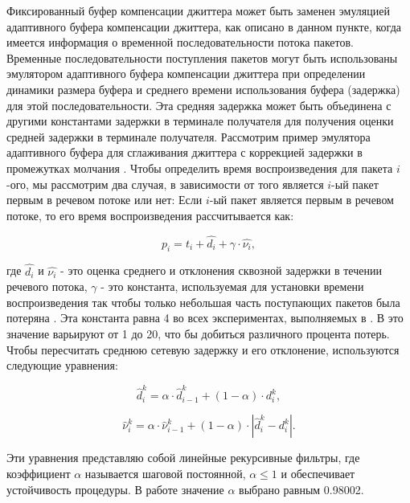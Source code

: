 Фиксированный буфер компенсации джиттера может быть заменен эмуляцией адаптивного буфера компенсации джиттера, как описано в данном пункте, когда имеется информация о временной последовательности потока пакетов. 
Временные последовательности поступления пакетов могут быть использованы эмулятором адаптивного буфера компенсации джиттера при определении динамики размера буфера и среднего времени использования буфера (задержка) для этой последовательности. Эта средняя задержка может быть объединена с другими константами задержки в терминале получателя для получения оценки средней задержки в терминале получателя. 
Рассмотрим пример эмулятора адаптивного буфера для сглаживания джиттера с коррекцией задержки в промежутках молчания \cite{Ramjee}. Чтобы определить время воспроизведения для пакета $i$-ого, мы рассмотрим два случая, в зависимости от того является $i$-ый пакет первым в речевом потоке или нет:
Если $i$-ый пакет является первым в речевом потоке, то его время воспроизведения рассчитывается как:

\begin{equation}\label{eq3:playout}
p_i=t_i+\hat{d_i}+\gamma\cdot\hat{\nu_i},
\end{equation}

\noindent где $\hat{d_i}$ и $\hat{\nu_i}$ - это оценка среднего и отклонения сквозной задержки в течении речевого потока, $\gamma$ - это константа, используемая для установки времени воспроизведения так чтобы только небольшая часть поступающих пакетов была потеряна \cite{Ramjee}. Эта константа равна 4 во всех экспериментах, выполняемых в \cite{Ramjee}. В \cite{Moon} это значение варьируют от 1 до 20, что бы добиться различного процента потерь. Чтобы пересчитать среднюю сетевую задержку и его отклонение, используются следующие уравнения:

\begin{equation}\label{eq3:playout_d}
\hat{d}_{i}^{k}=\alpha\cdot\hat{d}_{i-1}^{k}+(1-\alpha)\cdot d_{i}^{k},
\end{equation}

\begin{equation}\label{eq3:playout_v}
\hat{\nu}_{i}^{k}=\alpha\cdot\hat{\nu}_{i-1}^{k}+(1-\alpha)\cdot | \hat{d}_{i}^{k}-d_{i}^{k} |.
\end{equation}

Эти уравнения представляю собой линейные рекурсивные фильтры, где коэффициент $\alpha$ называется шаговой постоянной, $\alpha\leq1$ и обеспечивает устойчивость процедуры. В работе \cite{Ramjee} значение $\alpha$ выбрано равным 0.98002. 

